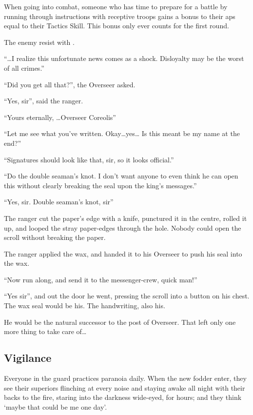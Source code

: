 \begin{multicols}{2}
When going into combat, someone who has time to prepare for a battle by running through instructions with receptive troops gains a bonus to their \glspl{ap} equal to their Tactics Skill.
This bonus only ever counts for the first \gls{round}.

The enemy resist with .

\begin{exampletext}

  ``\ldots I realize this unfortunate news comes as a shock.
  Disloyalty may be the worst of all crimes.''

  ``Did you get all that?'', the Overseer asked.

  ``Yes, sir'', said the ranger.

  ``Yours eternally, \ldots Overseer Coreolis''

  ``Let me see what you've written.
  Okay\ldots yes\ldots
  Is this meant be my name at the end?''

  ``Signatures should look like that, sir, so it looks official.''

  ``Do the double seaman's knot.
  I don't want anyone to even think he can open this without clearly breaking the seal upon the king's messages.''

  ``Yes, sir.
  Double seaman's knot, sir''

  The ranger cut the paper's edge with a knife, punctured it in the centre, rolled it up, and looped the stray paper-edges through the hole.
  Nobody could open the scroll without breaking the paper.

  The ranger applied the wax, and handed it to his Overseer to push his seal into the wax.

  ``Now run along, and send it to the messenger-crew, quick man!''

  ``Yes sir'', and out the door he went, pressing the scroll into a button on his chest.
  The wax seal would be his.
  The handwriting, also his.

  He would be the natural successor to the post of Overseer.
  That left only one more thing to take care of\ldots
  
\end{exampletext}

\subsection{Vigilance}

Everyone in the \gls{guard} practices paranoia daily.
When the new fodder enter, they see their superiors flinching at every noise and staying awake all night with their backs to the fire, staring into the darkness wide-eyed, for hours; and they think `maybe that could be me one day'.


\end{multicols}
